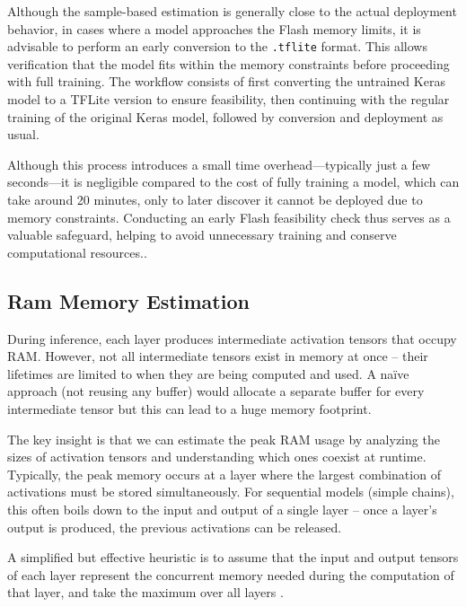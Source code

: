 Although the sample-based estimation is generally close to the actual deployment behavior, in cases where a model approaches the Flash memory limits, it is advisable to perform an early conversion to the \texttt{.tflite} format. This allows verification that the model fits within the memory constraints before proceeding with full training. The workflow consists of first converting the untrained Keras model to a TFLite version to ensure feasibility, then continuing with the regular training of the original Keras model, followed by conversion and deployment as usual.

Although this process introduces a small time overhead—typically just a few seconds—it is negligible compared to the cost of fully training a model, which can take around 20 minutes, only to later discover it cannot be deployed due to memory constraints. Conducting an early Flash feasibility check thus serves as a valuable safeguard, helping to avoid unnecessary training and conserve computational resources..

\clearpage

\subsection{Ram Memory Estimation}

During inference, each layer produces intermediate activation tensors that occupy RAM. However, not all intermediate tensors exist in memory at once – their lifetimes are limited to when they are being computed and used. A naïve approach (not reusing any buffer) would allocate a separate buffer for every intermediate tensor but this can lead to a huge memory footprint. \cite{tensorflow_RamEstimation} 


The key insight is that we can estimate the peak RAM usage by analyzing the sizes of activation tensors and understanding which ones coexist at runtime. Typically, the peak memory occurs at a layer where the largest combination of activations must be stored simultaneously. For sequential models (simple chains), this often boils down to the input and output of a single layer – once a layer’s output is produced, the previous activations can be released. \cite{liberis2019neural}

 A simplified but effective heuristic is to assume that the input and output tensors of each layer represent the concurrent memory needed during the computation of that layer, and take the maximum over all layers \cite{tensorflow_RamEstimation}. 

